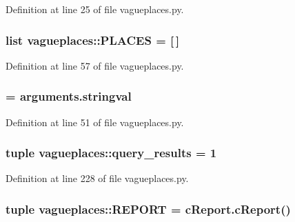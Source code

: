 \-Definition at line 25 of file vagueplaces.\-py.

\hypertarget{namespacevagueplaces_a611b348baa6cc63b93677dea3e188397}{
\subsubsection[{\-P\-L\-A\-C\-E\-S}]{\setlength{\rightskip}{0pt plus 5cm}list {\bf vagueplaces\-::\-P\-L\-A\-C\-E\-S} = \mbox{[}$\,$\mbox{]}}}\label{namespacevagueplaces_a611b348baa6cc63b93677dea3e188397}


\-Definition at line 57 of file vagueplaces.\-py.

\hypertarget{namespacevagueplaces_ac63c57bd9dfe86d7d5ff61f7e0d85a39}{
\subsubsection[{query\-\_\-list}]{ = arguments.\-stringval}}\label{namespacevagueplaces_ac63c57bd9dfe86d7d5ff61f7e0d85a39}


\-Definition at line 51 of file vagueplaces.\-py.

\hypertarget{namespacevagueplaces_a22c8a6a4861b99a18d096217c04a39af}{
\subsubsection[{query\-\_\-results}]{\setlength{\rightskip}{0pt plus 5cm}tuple {\bf vagueplaces\-::query\-\_\-results} = 1}}\label{namespacevagueplaces_a22c8a6a4861b99a18d096217c04a39af}


\-Definition at line 228 of file vagueplaces.\-py.

\hypertarget{namespacevagueplaces_a480d6041ef085842ab19117d6c95fc9c}{
\subsubsection[{\-R\-E\-P\-O\-R\-T}]{\setlength{\rightskip}{0pt plus 5cm}tuple {\bf vagueplaces\-::\-R\-E\-P\-O\-R\-T} = {\bf c\-Report.\-c\-Report}()}}\label{namespacevagueplaces_a480d6041ef085842ab19117d6c95fc9c}


